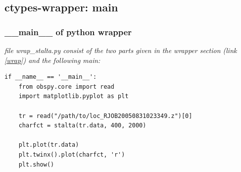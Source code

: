 \documentclass[utf8, compress, hyperref={pdftex=true,pdfpagemode=FullScreen}, graphicx={pdftex}]{beamer}
\begin{document}
\subsection{ctypes-wrapper: main}
\begin{frame}[fragile]
    \frametitle{\_\_main\_\_ of python wrapper}
    \textit{file wrap\_stalta.py consist of the two parts
    given in the wrapper section (link \ref{wrap}) and
    the following main:}
    \begin{lstlisting}
if __name__ == '__main__':
    from obspy.core import read
    import matplotlib.pyplot as plt

    tr = read("/path/to/loc_RJOB20050831023349.z")[0]
    charfct = stalta(tr.data, 400, 2000)
    
    plt.plot(tr.data)
    plt.twinx().plot(charfct, 'r')
    plt.show()
    \end{lstlisting}
\end{frame}
\end{document}
